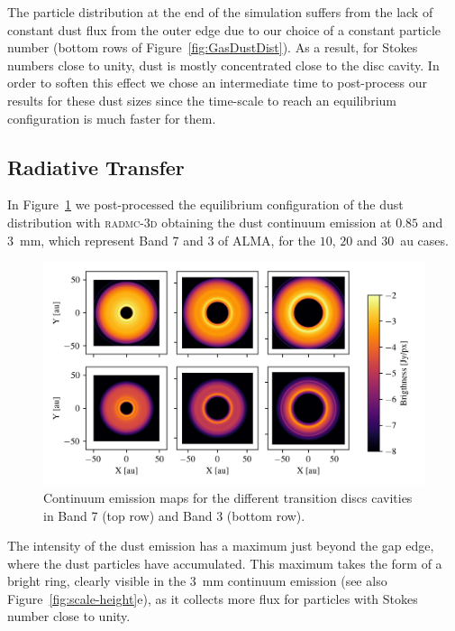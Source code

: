 \documentclass[fleqn,usenatbib]{mnras}
\begin{document}
        The particle distribution at the end of the simulation suffers from the lack of constant dust flux from the outer edge due to our choice of a constant particle number (bottom rows of Figure~\ref{fig:GasDustDist}). As a result, for Stokes numbers close to unity, dust is mostly concentrated close to the disc cavity. In order to soften this effect we chose an intermediate time to post-process our results for these dust sizes since the time-scale to reach an equilibrium configuration is much faster for them.
  
    \subsection{Radiative Transfer} \label{sec:radiative-transfer}
        In Figure~\ref{fig:DustContinuum} we post-processed the equilibrium configuration of the dust distribution with \textsc{radmc-3d} obtaining the dust continuum emission at $0.85$ and \SI{3}{mm}, which represent Band 7 and 3 of ALMA, for the $10$, $20$ and \SI{30}{au} cases.
        
        \begin{figure}
            \centering
            \includegraphics[width=\textwidth]{comparison_raw}
            \caption{Continuum emission maps for the different transition discs cavities in Band 7 (top row) and Band 3 (bottom row).}
            \label{fig:DustContinuum}
        \end{figure}
        
        The intensity of the dust emission has a maximum just beyond the gap edge, where the dust particles have accumulated. This maximum takes the form of a bright ring, clearly visible in the \SI{3}{mm} continuum emission (see also Figure~\ref{fig:scale-height}e), as it collects more flux for particles with Stokes number close to unity.
        
\end{document}

